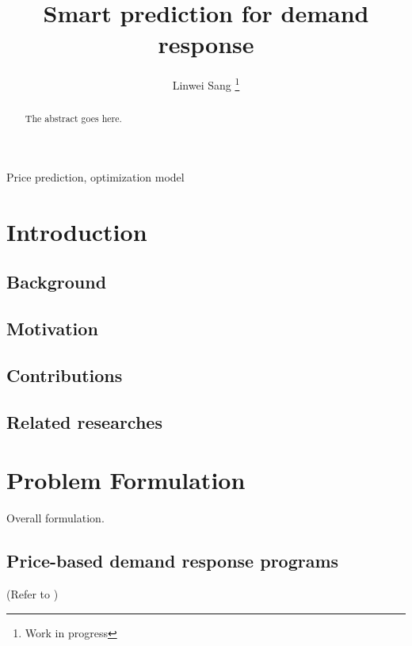 \documentclass[journal]{IEEEtran}
\begin{document}
\title{Smart prediction for demand response}

\author{Linwei Sang
\thanks{Work in progress}
}

\maketitle

\begin{abstract}
The abstract goes here.
\end{abstract}

\begin{IEEEkeywords}
Price prediction, optimization model
\end{IEEEkeywords}


\IEEEpeerreviewmaketitle


\section{Introduction}
\subsection{Background}

\subsection{Motivation}

\subsection{Contributions}

\subsection{Related researches}

\section{Problem Formulation}
Overall formulation.

\subsection{Price-based demand response programs}
(Refer to \cite{Chitsaz2018})
\end{document}
